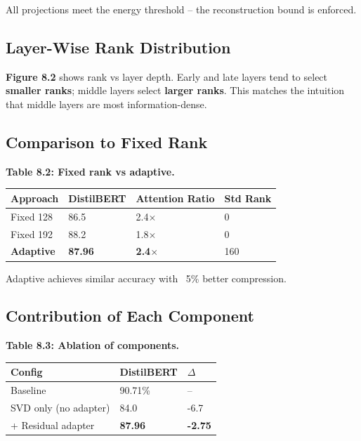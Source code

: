 All projections meet the energy threshold -- the reconstruction bound is 
enforced.

\subsection{Layer-Wise Rank Distribution}

\textbf{Figure 8.2} shows rank vs layer depth. Early and late layers tend to 
select \textbf{smaller ranks}; middle layers select \textbf{larger ranks}. This 
matches the intuition that middle layers are most information-dense.

\subsection{Comparison to Fixed Rank}

\textbf{Table 8.2: Fixed rank vs adaptive.}

\begin{table}[H]
\centering
\small
\begin{tabular}{llll}
\toprule
\textbf{Approach} & \textbf{DistilBERT} & \textbf{Attention Ratio} & \textbf{Std Rank} \\
\midrule
Fixed 128 & 86.5 & 2.4$\times$ & 0 \\
Fixed 192 & 88.2 & 1.8$\times$ & 0 \\
\textbf{Adaptive} & \textbf{87.96} & \textbf{2.4$\times$} & 160 \\
\bottomrule
\end{tabular}
\end{table}

Adaptive achieves similar accuracy with ~5\% better 
compression.

\subsection{Contribution of Each Component}

\textbf{Table 8.3: Ablation of components.}

\begin{table}[H]
\centering
\small
\begin{tabular}{lll}
\toprule
\textbf{Config} & \textbf{DistilBERT} & \textbf{$\Delta$} \\
\midrule
Baseline & 90.71\% & -- \\
SVD only (no adapter) & 84.0 & -6.7 \\
+ Residual adapter & \textbf{87.96} & \textbf{-2.75} \\
\bottomrule
\end{tabular}
\end{table}

